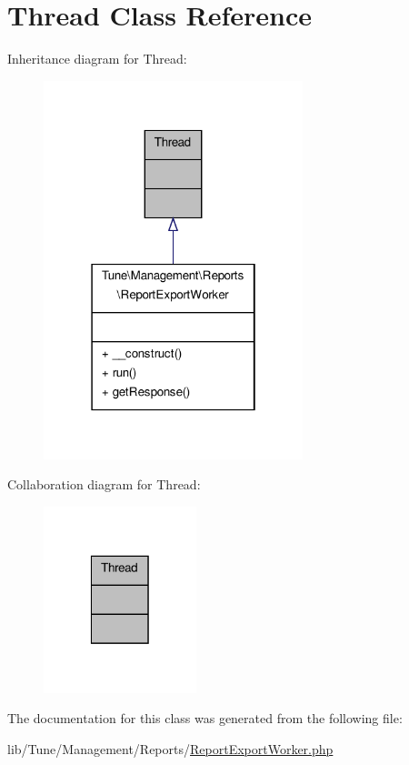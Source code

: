 \hypertarget{classThread}{\section{Thread Class Reference}
\label{classThread}
}


Inheritance diagram for Thread\-:
\nopagebreak
\begin{figure}[H]
\begin{center}
\leavevmode
\includegraphics[width=214pt]{classThread__inherit__graph}
\end{center}
\end{figure}


Collaboration diagram for Thread\-:
\nopagebreak
\begin{figure}[H]
\begin{center}
\leavevmode
\includegraphics[width=126pt]{classThread__coll__graph}
\end{center}
\end{figure}


The documentation for this class was generated from the following file\-:\begin{DoxyCompactItemize}
\item 
lib/\-Tune/\-Management/\-Reports/\hyperlink{ReportExportWorker_8php}{Report\-Export\-Worker.\-php}\end{DoxyCompactItemize}
